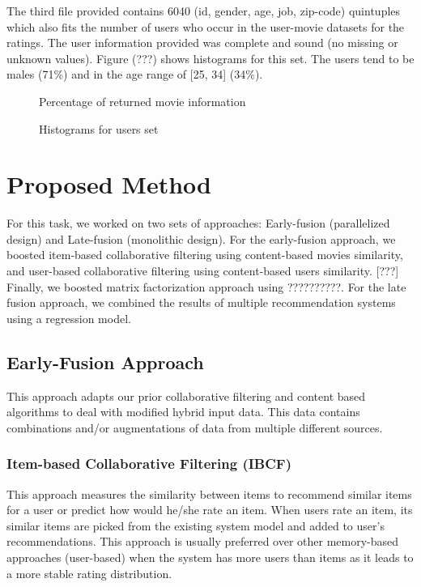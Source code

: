\documentclass{sigish}
\begin{document}
The third file provided contains 6040 (id, gender, age, job, zip-code) quintuples which also fits the number of users who occur in the user-movie datasets for the ratings. The user information provided was complete and sound (no missing or unknown values). Figure (???) shows histograms for this set. The users tend to be males (71\%) and in the age range of [25, 34] (34\%).

\begin{figure}
\centering
\caption{Percentage of returned movie information}
\label{fig:sources}
\end{figure}

\begin{figure}
\centering
\caption{Histograms for users set}
\label{fig:density}
\end{figure}

\section{Proposed Method}

For this task, we worked on two sets of approaches: Early-fusion (parallelized design) and Late-fusion (monolithic design). For the early-fusion approach, we boosted item-based collaborative filtering using content-based movies similarity, and user-based collaborative filtering using content-based users similarity. [???] Finally, we boosted matrix factorization approach using ??????????.
For the late fusion approach, we combined the results of multiple recommendation systems using a regression model.

\subsection{Early-Fusion Approach}

This approach adapts our prior collaborative filtering and content based algorithms to deal with modified hybrid input data. This data contains combinations and/or augmentations of data from multiple different sources.

\subsubsection{Item-based Collaborative Filtering (IBCF)}

This approach measures the similarity between items to recommend similar items for a user or predict how would he/she rate an item. When users rate an item, its similar items are picked from the existing system model and added to user's recommendations. This approach is usually preferred over other memory-based approaches (user-based) when the system has more users than items as it leads to a more stable rating distribution.
\end{document}
